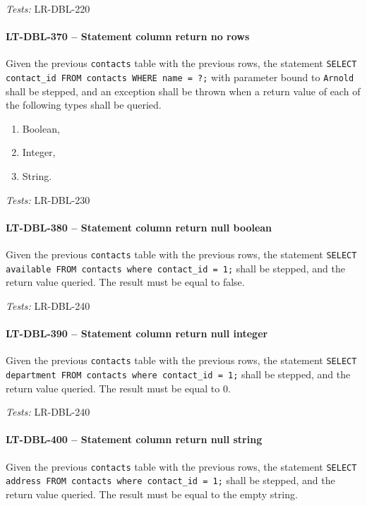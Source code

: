 \textit{Tests: } LR-DBL-220

\paragraph{LT-DBL-370 -- Statement column return no rows}
Given the previous \lstinline{contacts} table with the previous rows,
the statement
\lstinline{SELECT contact_id FROM contacts WHERE name = ?;}
with parameter bound to \lstinline{Arnold} shall be stepped,
and an exception shall be thrown when a return value of each of
the following types shall be queried.
\begin{enumerate}
\item Boolean,
\item Integer,
\item String.
\end{enumerate}

\textit{Tests: } LR-DBL-230

\paragraph{LT-DBL-380 -- Statement column return null boolean}
Given the previous \lstinline{contacts} table with the previous rows,
the statement \lstinline{SELECT available FROM contacts where contact_id = 1;}
shall be stepped, and the return value queried. The result must be equal to
false.

\textit{Tests: } LR-DBL-240

\paragraph{LT-DBL-390 -- Statement column return null integer}
Given the previous \lstinline{contacts} table with the previous rows,
the statement \lstinline{SELECT department FROM contacts where contact_id = 1;}
shall be stepped, and the return value queried. The result must be equal to
0.

\textit{Tests: } LR-DBL-240

\paragraph{LT-DBL-400 -- Statement column return null string}
Given the previous \lstinline{contacts} table with the previous rows,
the statement \lstinline{SELECT address FROM contacts where contact_id = 1;}
shall be stepped, and the return value queried. The result must be equal to
the empty string.


